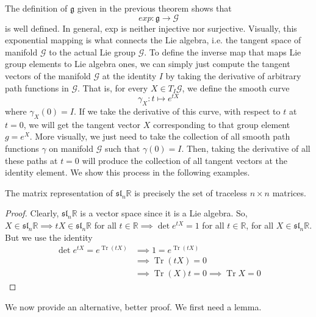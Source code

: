 \documentclass{article}
\DeclareMathOperator{\Tr}{Tr}
\begin{document}
    The definition of $\mathfrak{g}$ given in the previous theorem shows that 
    \[exp: \mathfrak{g} \longrightarrow \mathcal{G}\]
    is well defined. In general, exp is neither injective nor surjective. Visually, this exponential mapping is what connects the Lie algebra, i.e. the tangent space of manifold $\mathcal{G}$ to the actual Lie group $\mathcal{G}$. To define the inverse map that maps Lie group elements to Lie algebra ones, we can simply just compute the tangent vectors of the manifold $\mathcal{G}$ at the identity $I$ by taking the derivative of arbitrary path functions in $\mathcal{G}$. That is, for every $X \in T_I \mathcal{G}$, we define the smooth curve 
    \[\gamma_X: t \mapsto e^{tX}\]
    where $\gamma_X(0) = I$. If we take the derivative of this curve, with respect to $t$ at $t = 0$, we will get the tangent vector $X$ corresponding to that group element $g = e^{X}$. More visually, we just need to take the collection of all smooth path functions $\gamma$ on manifold $\mathcal{G}$ such that $\gamma(0) = I$. Then, taking the derivative of all these paths at $t = 0$ will produce the collection of all tangent vectors at the identity element. We show this process in the following examples. 
    \begin{theorem}
    The matrix representation of $\mathfrak{sl}_n \mathbb{R}$ is precisely the set of traceless $n \times n$ matrices. 
    \end{theorem}
    \begin{proof}
    Clearly, $\mathfrak{sl}_n \mathbb{R}$ is a vector space since it is a Lie algebra. So, $X \in \mathfrak{sl}_n \mathbb{R} \implies t X \in \mathfrak{sl}_n \mathbb{R}$ for all $t \in \mathbb{R} \implies \det{e^{tX}} = 1$ for all $t \in \mathbb{R}$, for all $X \in \mathfrak{sl}_n \mathbb{R}$. But we use the identity 
    \begin{align*}
        \det{e^{tX}} = e^{\Tr{(tX)}} & \implies 1 = e^{\Tr{(t X)}} \\
        & \implies \Tr{(tX)} = 0 \\
        & \implies \Tr{(X)} t = 0 \implies \Tr{X} = 0
    \end{align*}
    \end{proof}
    We now provide an alternative, better proof. We first need a lemma. 
\end{document}
